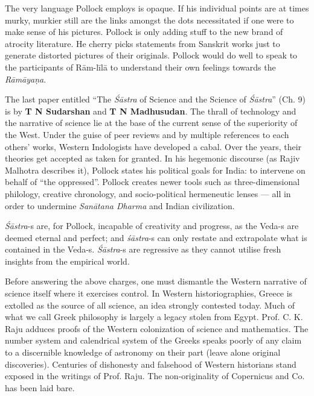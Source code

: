 \vskip -2pt

The very language Pollock employs is opaque. If his individual points are at times murky, murkier still are the links amongst the dots necessitated if one were to make sense of his pictures. Pollock is only adding stuff to the new brand of atrocity literature. He cherry picks statements from Sanskrit works just to generate distorted pictures of their originals. Pollock would do well to speak to the participants of Rām-līlā to understand their own feelings towards the \textit{Rāmāyaṇa}.

\vskip -2pt

The last paper entitled “The \textit{Śāstra} of Science and the Science of \textit{Śāstra}” (Ch. 9) is by \textbf{T N Sudarshan} and \textbf{T N Madhusudan}. The thrall of technology and the narrative of science lie at the base of the current sense of the superiority of the West. Under the guise of peer reviews and by multiple references to each others’ works, Western Indologists have developed a cabal. Over the years, their theories get accepted as taken for granted. In his hegemonic discourse (as Rajiv Malhotra describes it), Pollock states his political goals for India: to intervene on behalf of “the oppressed”. Pollock creates newer tools such as three-dimensional philology, creative chronology, and socio-political hermeneutic lenses --- all in order to undermine \textit{Sanātana Dharma} and Indian civilization.

\vskip -2pt

\textit{Śāstra}-s are, for Pollock, incapable of creativity and progress, as the Veda-s are deemed eternal and perfect; and \textit{śāstra}-s can only restate and extrapolate what is contained in the Veda-s. \textit{Śāstra}-s are regressive as they cannot utilise fresh insights from the empirical world.

Before answering the above charges, one must dismantle the Western narrative of science itself where it exercises control. In Western historiographies, Greece is extolled as the source of all science, an idea strongly contested today. Much of what we call Greek philosophy is largely a legacy stolen from Egypt. Prof. C. K. Raju adduces proofs of the Western colonization of science and mathematics. The number system and calendrical system of the Greeks speaks poorly of any claim to a discernible knowledge of astronomy on their part (leave alone original discoveries). Centuries of dishonesty and falsehood of Western historians stand exposed in the writings of Prof. Raju. The non-originality of Copernicus and Co. has been laid bare. 

